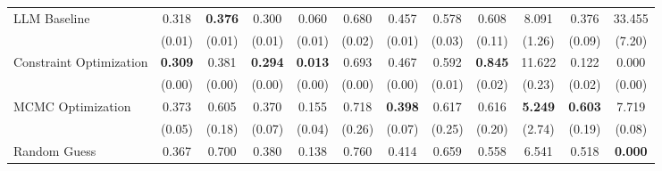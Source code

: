 \begin{table}[ht]
{\begin{tabular}{l cccc cccc cc c}
            \addlinespace[0.2em]
            LLM Baseline            & 0.318                                           & \textbf{0.376}                               & 0.300                                         & 0.060                   & 0.680             & 0.457          & 0.578          & 0.608          & 8.091           & 0.376            & 33.455            \\
                                    & (0.01)                                          & (0.01)                                       & (0.01)                                        & (0.01)                  & (0.02)            & (0.01)         & (0.03)         & (0.11)         & (1.26)          & (0.09)           & (7.20)            \\
            \addlinespace[0.2em]
            Constraint Optimization & \textbf{0.309}                                  & 0.381                                        & \textbf{0.294      }                          & \textbf{0.013   }       & 0.693             & 0.467          & 0.592          & \textbf{0.845} & 11.622          & 0.122            & 0.000             \\
                                    & (0.00)                                          & (0.00)                                       & (0.00)                                        & (0.00)                  & (0.00)            & (0.00)         & (0.01)         & (0.02)         & (0.23)          & (0.02)           & (0.00)            \\
            \addlinespace[0.2em]
            MCMC Optimization       & 0.373                                           & 0.605                                        & 0.370                                         & 0.155                   & 0.718             & \textbf{0.398} & 0.617          & 0.616          & \textbf{5.249}  & \textbf{0.603  } & 7.719             \\
                                    & (0.05)                                          & (0.18)                                       & (0.07)                                        & (0.04)                  & (0.26)            & (0.07)         & (0.25)         & (0.20)         & (2.74)          & (0.19)           & (0.08)            \\
            \addlinespace[0.2em]
            Random Guess            & 0.367                                           & 0.700                                        & 0.380                                         & 0.138                   & 0.760             & 0.414          & 0.659          & 0.558          & 6.541           & 0.518            & \textbf{0.000}    \\

\end{tabular}}
\end{table}
